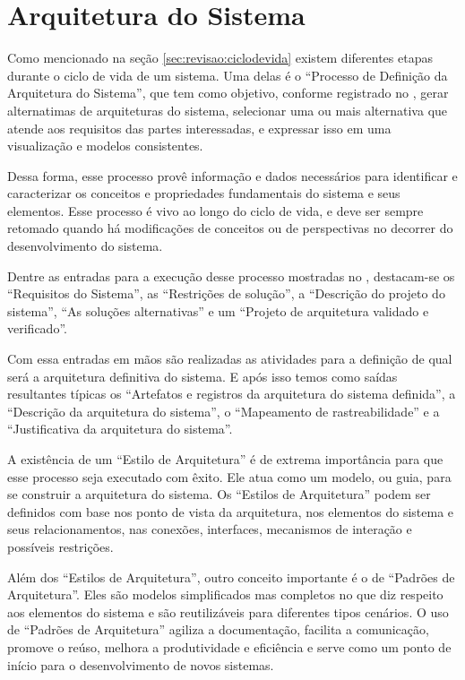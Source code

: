 	\section{Arquitetura do Sistema}\label{sec:revisao:arqSistema}

	Como mencionado na seção \ref{sec:revisao:ciclodevida} existem diferentes etapas durante o ciclo de vida de
	um sistema. Uma delas é o ``Processo de Definição da Arquitetura do Sistema'', que tem como objetivo, conforme registrado
	no \cite{incoseHandbook}, gerar alternatimas de arquiteturas do sistema, selecionar uma ou mais alternativa que atende aos
	requisitos das partes interessadas, e expressar isso em uma visualização e modelos consistentes.

	Dessa forma, esse processo provê informação e dados necessários para identificar e caracterizar os conceitos e
	propriedades fundamentais do sistema e seus elementos. Esse processo é vivo ao longo do ciclo de vida, e deve ser sempre
	retomado quando há modificações de conceitos ou de perspectivas no decorrer do desenvolvimento do sistema.

	Dentre as entradas para a execução desse processo mostradas no \cite{incoseHandbook}, destacam-se os ``Requisitos do Sistema'',
	as ``Restrições de solução'', a ``Descrição do projeto do sistema'', ``As soluções alternativas'' e um ``Projeto de arquitetura validado e verificado''.

	Com essa entradas em mãos são realizadas as atividades para a definição de qual será a arquitetura definitiva do sistema. E após
	isso temos como saídas resultantes típicas os ``Artefatos e registros da arquitetura do sistema definida'', a ``Descrição da 
	arquitetura do sistema'', o ``Mapeamento de rastreabilidade'' e a ``Justificativa da arquitetura do sistema''.
	 
	A existência de um ``Estilo de Arquitetura'' é de extrema importância para que esse processo seja executado com êxito.
	Ele	atua como um modelo, ou guia, para se construir a arquitetura do sistema. Os ``Estilos de Arquitetura'' podem 
	ser definidos com base nos ponto de vista da arquitetura, nos elementos do
	sistema e seus relacionamentos, nas conexões, interfaces, mecanismos de interação e possíveis restrições.
	
	Além dos ``Estilos de Arquitetura'', outro conceito importante é o de ``Padrões de Arquitetura''. 
	Eles são modelos simplificados mas completos no que diz respeito aos elementos do
	sistema e são reutilizáveis para diferentes tipos cenários. O uso de ``Padrões de Arquitetura'' agiliza  a 
	documentação, facilita a comunicação, promove o reúso, melhora a produtividade
	e eficiência e serve como um ponto de início para o desenvolvimento de novos sistemas.

